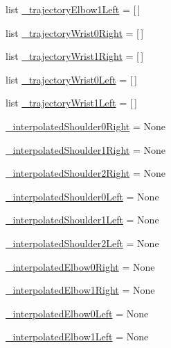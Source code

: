 \begin{DoxyCompactItemize}
\item 
list \mbox{\hyperlink{namespacesteering__simulation_adb1fd212106914e45e4864d5a3950884}{\+\_\+trajectory\+Elbow1\+Left}} = \mbox{[}$\,$\mbox{]}
\item 
list \mbox{\hyperlink{namespacesteering__simulation_afe9e1def4f12d1f011a8e0e6c2051f48}{\+\_\+trajectory\+Wrist0\+Right}} = \mbox{[}$\,$\mbox{]}
\item 
list \mbox{\hyperlink{namespacesteering__simulation_a48daa3f5dc8c583ae35007d94df2303e}{\+\_\+trajectory\+Wrist1\+Right}} = \mbox{[}$\,$\mbox{]}
\item 
list \mbox{\hyperlink{namespacesteering__simulation_a65b6250dbe1a9a65e76a41c62da9ea7e}{\+\_\+trajectory\+Wrist0\+Left}} = \mbox{[}$\,$\mbox{]}
\item 
list \mbox{\hyperlink{namespacesteering__simulation_a4f098ae88427b37c42fde098a61fb399}{\+\_\+trajectory\+Wrist1\+Left}} = \mbox{[}$\,$\mbox{]}
\item 
\mbox{\hyperlink{namespacesteering__simulation_ab34c683386394a4c7bb2641db1866aef}{\+\_\+interpolated\+Shoulder0\+Right}} = None
\item 
\mbox{\hyperlink{namespacesteering__simulation_a0e35e7ece667da88fa757991130d307d}{\+\_\+interpolated\+Shoulder1\+Right}} = None
\item 
\mbox{\hyperlink{namespacesteering__simulation_a756387ef588b4049bba42da3f65fef74}{\+\_\+interpolated\+Shoulder2\+Right}} = None
\item 
\mbox{\hyperlink{namespacesteering__simulation_a02b9a3d44de85acf12552bea98742482}{\+\_\+interpolated\+Shoulder0\+Left}} = None
\item 
\mbox{\hyperlink{namespacesteering__simulation_a3d00a16f91310a8d1e087d1ae152ac7e}{\+\_\+interpolated\+Shoulder1\+Left}} = None
\item 
\mbox{\hyperlink{namespacesteering__simulation_ac4a5b7a74bda32146e2330b740a782e5}{\+\_\+interpolated\+Shoulder2\+Left}} = None
\item 
\mbox{\hyperlink{namespacesteering__simulation_ae6eeda8709f7c3112029ba2123f2a0cd}{\+\_\+interpolated\+Elbow0\+Right}} = None
\item 
\mbox{\hyperlink{namespacesteering__simulation_ac91c7d1fa823783ae6d5e03fd9ebdddb}{\+\_\+interpolated\+Elbow1\+Right}} = None
\item 
\mbox{\hyperlink{namespacesteering__simulation_ab4a2cd7647ac12ccda18d55806c1c968}{\+\_\+interpolated\+Elbow0\+Left}} = None
\item 
\mbox{\hyperlink{namespacesteering__simulation_ab9d03f365a99bbc5047aa6f1693bb650}{\+\_\+interpolated\+Elbow1\+Left}} = None

\end{DoxyCompactItemize}
